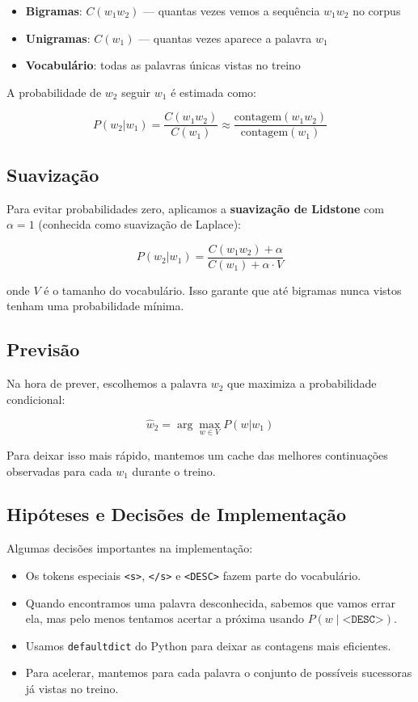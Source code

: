 \documentclass[12pt,a4paper]{article}
\begin{document}
\begin{itemize}
    \item \textbf{Bigramas}: $C(w_1w_2)$ — quantas vezes vemos a sequência $w_1w_2$ no corpus
    \item \textbf{Unigramas}: $C(w_1)$ — quantas vezes aparece a palavra $w_1$
    \item \textbf{Vocabulário}: todas as palavras únicas vistas no treino
\end{itemize}

A probabilidade de $w_2$ seguir $w_1$ é estimada como:

\[
P(w_2|w_1) = \frac{C(w_1w_2)}{C(w_1)} \approx \frac{\text{contagem}(w_1w_2)}{\text{contagem}(w_1)}
\]

\subsection{Suavização}

Para evitar probabilidades zero, aplicamos a \textbf{suavização de Lidstone} com $\alpha = 1$ (conhecida como suavização de Laplace):

\[
P(w_2|w_1) = \frac{C(w_1w_2) + \alpha}{C(w_1) + \alpha \cdot V}
\]

onde $V$ é o tamanho do vocabulário. Isso garante que até bigramas nunca vistos tenham uma probabilidade mínima.

\subsection{Previsão}

Na hora de prever, escolhemos a palavra $w_2$ que maximiza a probabilidade condicional:

\[
\hat{w}_2 = \arg\max_{w \in V} P(w|w_1)
\]

Para deixar isso mais rápido, mantemos um cache das melhores continuações observadas para cada $w_1$ durante o treino.

\subsection{Hipóteses e Decisões de Implementação}

Algumas decisões importantes na implementação:

\begin{itemize}
    \item Os tokens especiais \texttt{<s>}, \texttt{</s>} e \texttt{<DESC>} fazem parte do vocabulário.
    \item Quando encontramos uma palavra desconhecida, sabemos que vamos errar ela, mas pelo menos tentamos acertar a próxima usando $P(w\mid\texttt{<DESC>})$.
    \item Usamos \texttt{defaultdict} do Python para deixar as contagens mais eficientes.
    \item Para acelerar, mantemos para cada palavra o conjunto de possíveis sucessoras já vistas no treino.
\end{itemize}
\end{document}
